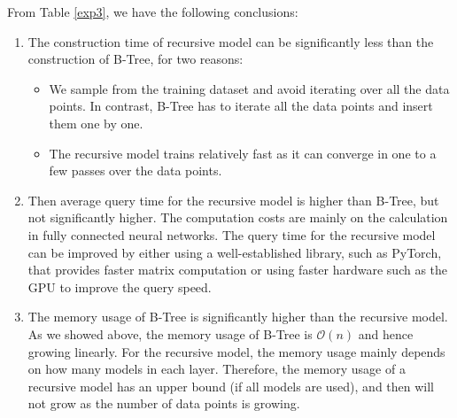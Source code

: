 \begin{mscconclusion}
	From Table \ref{exp3}, we have the following conclusions:
	\begin{enumerate}
		\item The construction time of recursive model can be significantly less than the construction of B-Tree, for two reasons: 
			\begin{itemize}
				\item We sample from the training dataset and avoid iterating over all the data points. In contrast, B-Tree has to iterate all the data points and insert them one by one.
				\item The recursive model trains relatively fast as it can converge in one to a few passes over the data points.
			\end{itemize}
			\item Then average query time for the recursive model is higher than B-Tree, but not significantly higher. The computation costs are mainly on the calculation in fully connected neural networks. The query time for the recursive model can be improved by either using a well-established library, such as PyTorch, that provides faster matrix computation or using faster hardware such as the GPU to improve the query speed.
			\item The memory usage of B-Tree is significantly higher than the recursive model. As we showed above, the memory usage of B-Tree is $\mathcal{O}(n)$ and hence growing linearly. For the recursive model, the memory usage mainly depends on how many models in each layer. Therefore, the memory usage of a recursive model has an upper bound (if all models are used), and then will not grow as the number of data points is growing.
	\end{enumerate}
\end{mscconclusion}










